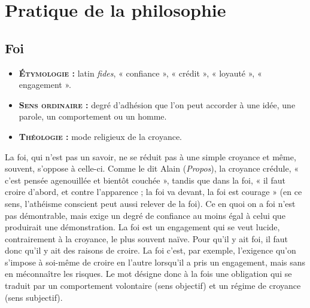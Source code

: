 
\section{Pratique de la philosophie}

\subsection{Foi}




\begin{itemize}[leftmargin=1cm, label=, itemsep=1pt]
\item {\bf \textsc{Étymologie} :} latin {\it fides},
« confiance », « crédit », « loyauté »,
« engagement ».
\item {\bf \textsc{Sens ordinaire} :} degré d'adhésion que l'on peut
accorder à une idée, une parole, un
comportement ou un homme.
\item {\bf \textsc{Théologie} :} mode religieux de la
croyance.
\end{itemize}

La foi, qui n’est pas un savoir, ne se
réduit pas à une simple croyance et
même, souvent, s'oppose à celle-ci.
Comme le dit Alain ({\it Propos}), la
croyance crédule, « c’est pensée agenouillée
et bientôt couchée », tandis
que dans la foi, « il faut croire d’abord,
et contre l’apparence ; la foi va devant,
la foi est courage » (en ce sens,
l’athéisme conscient peut aussi relever
de la foi). Ce en quoi on a foi n’est pas
démontrable, mais exige un degré de
confiance au moins égal à celui que
produirait une démonstration. La foi est
un engagement qui se veut lucide,
contrairement à la croyance, le plus
souvent naïve. Pour qu'il y ait foi, il
faut donc qu'il y ait des raisons de
croire. La foi c’est, par exemple, l’exigence
qu'on s'impose à soi-même de
croire en l'autre lorsqu'il a pris un
engagement, mais sans en méconnaître
les risques. Le mot désigne donc à la
fois une obligation qui se traduit par
un comportement volontaire (sens
objectif) et un régime de croyance
(sens subjectif).

